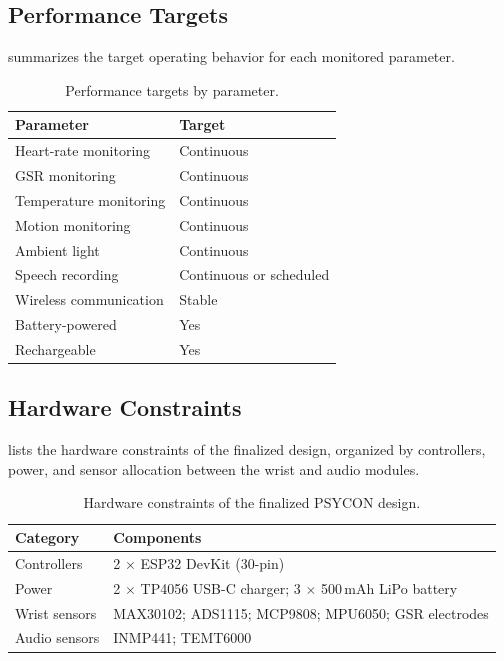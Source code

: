 \subsection{Performance Targets}
\label{sec:performance-targets}

 summarizes the target operating behavior for each monitored parameter.

\begin{table}[H]
\centering
\caption{Performance targets by parameter.}
\label{tab:performance-targets}
\small
\begin{tabularx}{\columnwidth}{@{}Y l@{}}
\toprule
\textbf{Parameter} & \textbf{Target} \\
\midrule
Heart-rate monitoring & Continuous \\
GSR monitoring & Continuous \\
Temperature monitoring & Continuous \\
Motion monitoring & Continuous \\
Ambient light & Continuous \\
Speech recording & Continuous or scheduled \\
Wireless communication & Stable \\
Battery-powered & Yes \\
Rechargeable & Yes \\
\bottomrule
\end{tabularx}
\end{table}

\subsection{Hardware Constraints}
\label{sec:hardware-constraints}

 lists the hardware constraints of the finalized design, organized by controllers, power, and sensor allocation between the wrist and audio modules.

\begin{table}[H]
\centering
\caption{Hardware constraints of the finalized PSYCON design.}
\label{tab:hardware-constraints}
\small
\begin{tabularx}{\columnwidth}{@{}l Y@{}}
\toprule
\textbf{Category} & \textbf{Components} \\
\midrule
Controllers & 2 $\times$ ESP32 DevKit (30-pin) \\
Power & 2 $\times$ TP4056 USB-C charger; 3 $\times$ 500\,mAh LiPo battery \\
Wrist sensors & MAX30102; ADS1115; MCP9808; MPU6050; GSR electrodes \\
Audio sensors & INMP441; TEMT6000 \\
\bottomrule
\end{tabularx}
\end{table}

